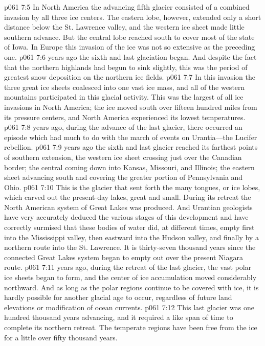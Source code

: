 \vs p061 7:5 In North America the advancing fifth glacier consisted of a combined invasion by all three ice centers. The eastern lobe, however, extended only a short distance below the St. Lawrence valley, and the western ice sheet made little southern advance. But the central lobe reached south to cover most of the state of Iowa. In Europe this invasion of the ice was not so extensive as the preceding one.
\pc \vs p061 7:6  years ago the sixth and last glaciation began. And despite the fact that the northern highlands had begun to sink slightly, this was the period of greatest snow deposition on the northern ice fields.
\vs p061 7:7 In this invasion the three great ice sheets coalesced into one vast ice mass, and all of the western mountains participated in this glacial activity. This was the largest of all ice invasions in North America; the ice moved south over fifteen hundred miles from its pressure centers, and North America experienced its lowest temperatures.
\pc \vs p061 7:8  years ago, during the advance of the last glacier, there occurred an episode which had much to do with the march of events on Urantia---the Lucifer rebellion.
\pc \vs p061 7:9  years ago the sixth and last glacier reached its farthest points of southern extension, the western ice sheet crossing just over the Canadian border; the central coming down into Kansas, Missouri, and Illinois; the eastern sheet advancing south and covering the greater portion of Pennsylvania and Ohio.
\vs p061 7:10 This is the glacier that sent forth the many tongues, or ice lobes, which carved out the present\hyp{}day lakes, great and small. During its retreat the North American system of Great Lakes was produced. And Urantian geologists have very accurately deduced the various stages of this development and have correctly surmised that these bodies of water did, at different times, empty first into the Mississippi valley, then eastward into the Hudson valley, and finally by a northern route into the St. Lawrence. It is thirty\hyp{}seven thousand years since the connected Great Lakes system began to empty out over the present Niagara route.
\pc \vs p061 7:11  years ago, during the retreat of the last glacier, the vast polar ice sheets began to form, and the center of ice accumulation moved considerably northward. And as long as the polar regions continue to be covered with ice, it is hardly possible for another glacial age to occur, regardless of future land elevations or modification of ocean currents.
\vs p061 7:12 This last glacier was one hundred thousand years advancing, and it required a like span of time to complete its northern retreat. The temperate regions have been free from the ice for a little over fifty thousand years.
